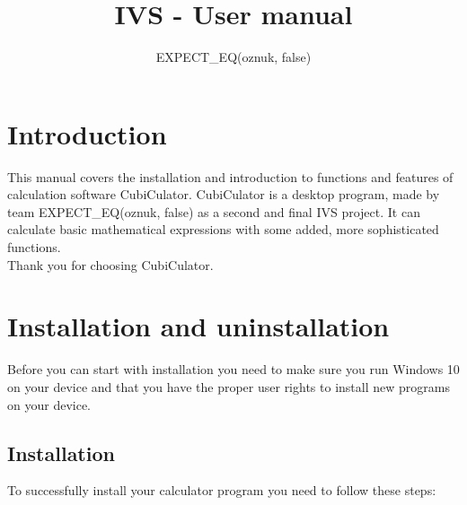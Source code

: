 \documentclass{article}
\title{IVS - User manual}
\author{EXPECT\_EQ(oznuk, false)}
\begin{document}
\maketitle

\tableofcontents


\section{Introduction}

This manual covers the installation and introduction to functions and features of calculation software CubiCulator. CubiCulator is a desktop program, made by team EXPECT\_EQ(oznuk, false) as a second and final IVS project. It can calculate basic mathematical expressions with some added, more sophisticated functions.
\\Thank you for choosing CubiCulator. 


\section{Installation and uninstallation}
Before you can start with installation you need to make sure you run Windows 10 on your device and that you have the proper user rights to install new programs on your device. 

\subsection{Installation}
To successfully install your calculator program you need to follow these steps:
\end{document}
